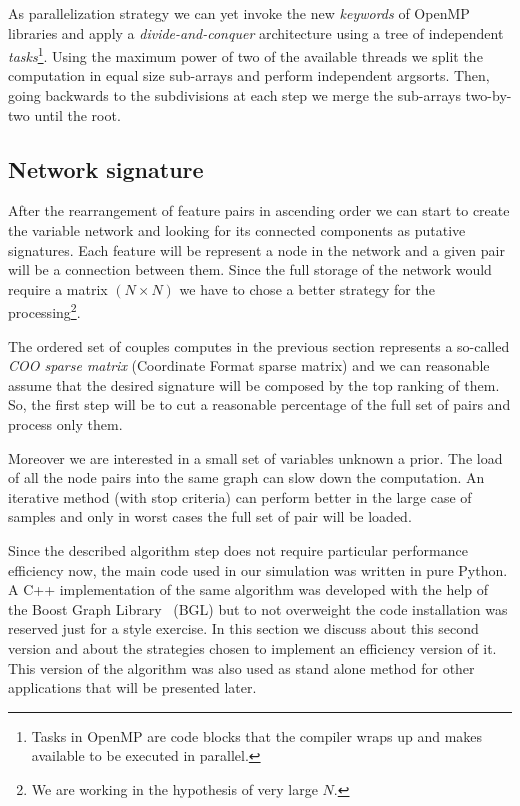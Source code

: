 \documentclass{standalone}
\begin{document}

As parallelization strategy we can yet invoke the new \emph{keywords} of OpenMP libraries and apply a \emph{divide-and-conquer} architecture using a tree of independent \emph{tasks}\footnote{
  Tasks in OpenMP are code blocks that the compiler wraps up and makes available to be executed in parallel.
}.
Using the maximum power of two of the available threads we split the computation in equal size sub-arrays and perform independent \textsf{argsort}s.
Then, going backwards to the subdivisions at each step we merge the sub-arrays two-by-two until the root.


\subsection[Network Signature]{Network signature}\label{implementation:network}

After the rearrangement of feature pairs in ascending order we can start to create the variable network and looking for its connected components as putative signatures.
Each feature will be represent a node in the network and a given pair will be a connection between them.
Since the full storage of the network would require a matrix $(N\times N)$ we have to chose a better strategy for the processing\footnote{
  We are working in the hypothesis of very large $N$.
}.

The ordered set of couples computes in the previous section represents a so-called \emph{COO sparse matrix} (Coordinate Format sparse matrix) and we can reasonable assume that the desired signature will be composed by the top ranking of them.
So, the first step will be to cut a reasonable percentage of the full set of pairs and process only them.

Moreover we are interested in a small set of variables unknown a prior.
The load of all the node pairs into the same graph can slow down the computation.
An iterative method (with stop criteria) can perform better in the large case of samples and only in worst cases the full set of pair will be loaded.

Since the described algorithm step does not require particular performance efficiency now, the main code used in our simulation was written in pure Python.
A C++ implementation of the same algorithm was developed with the help of the Boost Graph Library~\cite{BGL} (BGL) but to not overweight the code installation was reserved just for a style exercise.
In this section we discuss about this second version and about the strategies chosen to implement an efficiency version of it.
This version of the algorithm was also used as stand alone method for other applications that will be presented later.
\end{document}
